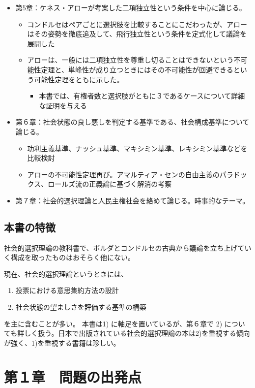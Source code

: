 \documentclass{article}
\begin{document}
\begin{itemize}
\item 第5章：ケネス・アローが考案した二項独立性という条件を中心に論じる。
\begin{itemize}
\item コンドルセはペアごとに選択肢を比較することにこだわったが、アローはその姿勢を徹底追及して、飛行独立性という条件を定式化して議論を展開した
\item アローは、一般には二項独立性を尊重し切ることはできないという不可能性定理と、単峰性が成り立つときにはその不可能性が回避できるという可能性定理をともに示した。
\begin{itemize}
\item 本書では、有権者数と選択肢がともに３であるケースについて詳細な証明を与える
\end{itemize}
\end{itemize}
\item 第６章：社会状態の良し悪しを判定する基準である、社会構成基準について論じる。
\begin{itemize}
\item 功利主義基準、ナッシュ基準、マキシミン基準、レキシミン基準などを比較検討
\item アローの不可能性定理再び。アマルティア・センの自由主義のパラドックス、ロールズ流の正義論に基づく解消の考察
\end{itemize}
\item 第７章：社会的選択理論と人民主権社会を絡めて論じる。時事的なテーマ。
\end{itemize}

\subsection{本書の特徴}
\label{sec:orgc0c4c37}
社会的選択理論の教科書で、ボルダとコンドルセの古典から議論を立ち上げていく構成を取ったものはおそらく他にない。

現在、社会的選択理論というときには、
\begin{enumerate}
\item 投票における意思集約方法の設計
\item 社会状態の望ましさを評価する基準の構築
\end{enumerate}

を主に含むことが多い。
本書は1) に軸足を置いているが、第６章で 2) についても詳しく扱う。日本で出版されている社会的選択理論の本は2)を重視する傾向が強く、1)を重視する書籍は珍しい。

\section{第１章　問題の出発点}
\label{sec:org3050e57}
\end{document}
